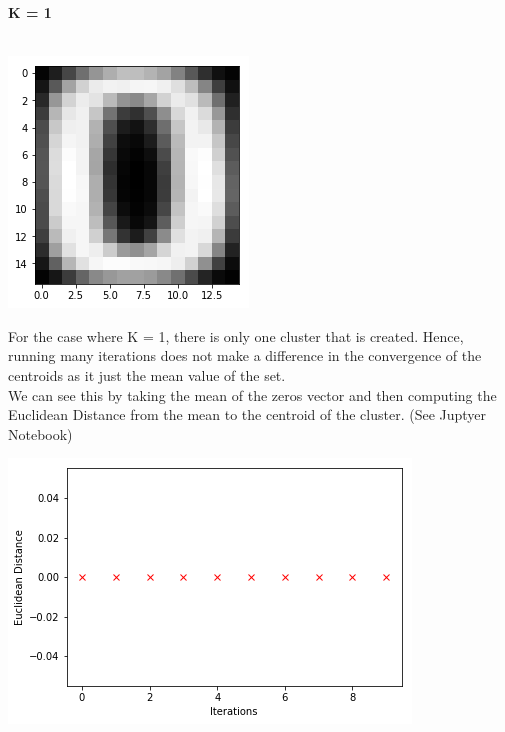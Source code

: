 \documentclass[a4paper]{article}
\begin{document}
{
{\textbf{\large K = 1}} \\ \\

\begin{center}
\includegraphics[scale=1.0]{./k1.png}  \\
\end{center}

For the case where K = 1, there is only one cluster that is created. Hence, running many iterations does not make a difference in the convergence of the centroids as it just the mean value of the set. \\ 
We can see this by taking the mean of the zeros vector and then computing the Euclidean Distance from the mean to the centroid of the cluster. (See Juptyer Notebook)\\
\begin{center}
 \includegraphics[scale=.80]{./k1plt.png} \\
\end{center} 

}
\end{document}
